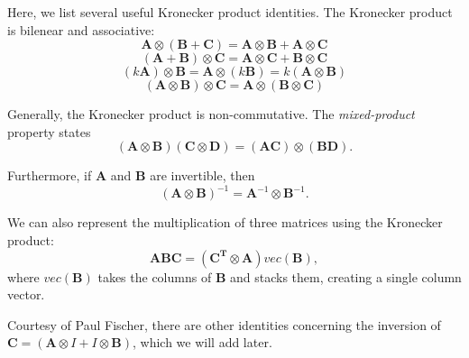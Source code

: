 \documentclass{article}
\begin{document}
Here, we list several useful Kronecker product identities.
The Kronecker product is bilenear and associative:
\begin{equation}
  \mathbf{A} \otimes (\mathbf{B} + \mathbf{C}) = \mathbf{A} \otimes \mathbf{B} +
  \mathbf{A} \otimes \mathbf{C}
\end{equation}
\begin{equation}
  (\mathbf{A} + \mathbf{B}) \otimes \mathbf{C} = \mathbf{A} \otimes \mathbf{C} + \mathbf{B} \otimes
  \mathbf{C}
\end{equation}
\begin{equation}
  (k\mathbf{A}) \otimes \mathbf{B} = \mathbf{A} \otimes (k\mathbf{B}) = k(\mathbf{A}
  \otimes \mathbf{B})
\end{equation}
\begin{equation}
  (\mathbf{A} \otimes \mathbf{B}) \otimes \mathbf{C} = \mathbf{A} \otimes
  (\mathbf{B} \otimes \mathbf{C})
\end{equation}

Generally, the Kronecker product is non-commutative. The {\em mixed-product} property states
\begin{equation}\label{mixed-product}
  (\mathbf{A}\otimes\mathbf{B})(\mathbf{C}\otimes\mathbf{D}) = (\mathbf{A}\mathbf{C})
  \otimes (\mathbf{B}\mathbf{D}).
\end{equation}

Furthermore, if $\mathbf{A}$ and $\mathbf{B}$ are invertible, then
\begin{equation}
(\mathbf{A} \otimes \mathbf{B})^{-1} = \mathbf{A}^{-1} \otimes \mathbf{B}^{-1}.
\end{equation}

We can also represent the multiplication of three matrices using the Kronecker
product:
\begin{equation}\label{matmult}
  \mathbf{A}\mathbf{B}\mathbf{C} = (\mathbf{C^T}\otimes\mathbf{A})vec(\mathbf{B}),
\end{equation}
where $vec(\mathbf{B})$ takes the columns of $\mathbf{B}$ and stacks them, creating a
single column vector.

Courtesy of Paul Fischer, there are other identities concerning the
inversion of $\mathbf{C} = (\mathbf{A} \otimes I + I\otimes\mathbf{B})$, which
we will add later.
\end{document}
